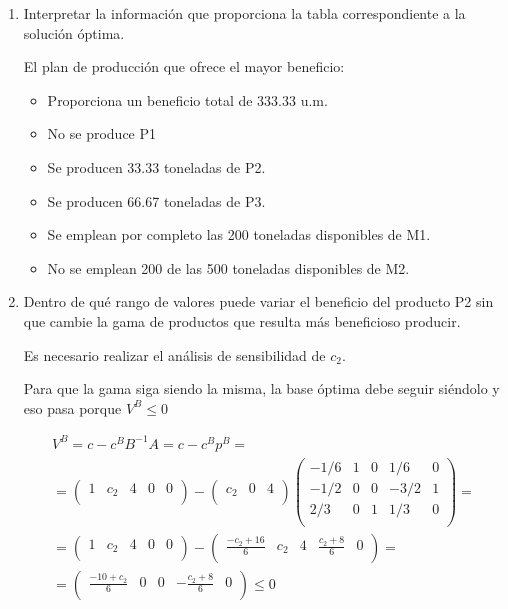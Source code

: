 \begin{enumerate}
    \item Interpretar la información que proporciona la tabla correspondiente a la solución óptima.

    El plan de producción que ofrece el mayor beneficio:
    \begin{itemize}
        \item Proporciona un beneficio total de 333.33 u.m.
        \item No se produce P1
        \item Se producen 33.33 toneladas de P2.
        \item Se producen 66.67 toneladas de P3.
        \item Se emplean por completo las 200 toneladas disponibles de M1.
        \item No se emplean 200 de las 500 toneladas disponibles de M2.
        
    \end{itemize}

    \item Dentro de qué rango de valores puede variar el beneficio del producto P2 sin que cambie la gama de productos que resulta más beneficioso producir.

    Es necesario realizar el análisis de sensibilidad de $c_2$.

    Para que la gama siga siendo la misma, la base óptima debe seguir siéndolo y eso pasa porque $V^B \leq 0$

    \begin{equation}
    \begin{split}
    V^B = c-c^BB^{-1}A = c-c^Bp^B =\\
    = \begin{pmatrix}
    1 & c_2 & 4 & 0 & 0\\
    \end{pmatrix}
     - \begin{pmatrix}
    c_2 & 0 & 4\\
    \end{pmatrix}
    \begin{pmatrix}
    -1/6 & 1 & 0 & 1/6 & 0\\
    -1/2 & 0 & 0 & -3/2 & 1\\
    2/3 & 0 & 1 & 1/3 & 0\\
    \end{pmatrix}
     = \\
     =\begin{pmatrix}
    1 & c_2 & 4 & 0 & 0\\
    \end{pmatrix} - 
     \begin{pmatrix}
    \frac{-c_2+16}{6}  &  c_2  & 4 & \frac{c_2+8}{6}  & 0 \\
    \end{pmatrix}=   \\  
     =\begin{pmatrix}
     \frac{-10+c_2}{6}& 0 & 0 & -\frac{c_2+8}{6} & 0\\
    \end{pmatrix} \leq 0
    \end{split}
    \end{equation}
        

\end{enumerate}
